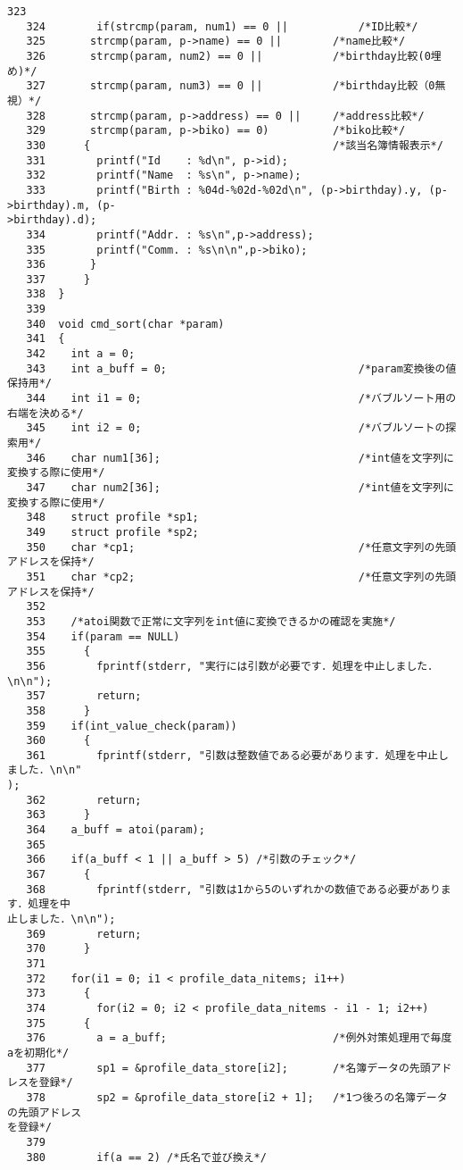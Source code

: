 \begin{Verbatim}[fontsize=\small, baselinestretch=0.8]
   323	
   324	      if(strcmp(param, num1) == 0 ||           /*ID比較*/
   325		 strcmp(param, p->name) == 0 ||        /*name比較*/
   326		 strcmp(param, num2) == 0 ||           /*birthday比較(0埋め)*/
   327		 strcmp(param, num3) == 0 ||           /*birthday比較（0無視）*/
   328		 strcmp(param, p->address) == 0 ||     /*address比較*/
   329		 strcmp(param, p->biko) == 0)          /*biko比較*/
   330		{                                      /*該当名簿情報表示*/
   331		  printf("Id    : %d\n", p->id);
   332		  printf("Name  : %s\n", p->name);
   333		  printf("Birth : %04d-%02d-%02d\n", (p->birthday).y, (p->birthday).m, (p-
>birthday).d);
   334		  printf("Addr. : %s\n",p->address);
   335		  printf("Comm. : %s\n\n",p->biko);
   336		 }
   337	    }
   338	}
   339	
   340	void cmd_sort(char *param)
   341	{
   342	  int a = 0;
   343	  int a_buff = 0;                              /*param変換後の値保持用*/  
   344	  int i1 = 0;                                  /*バブルソート用の右端を決める*/
   345	  int i2 = 0;                                  /*バブルソートの探索用*/
   346	  char num1[36];                               /*int値を文字列に変換する際に使用*/
   347	  char num2[36];                               /*int値を文字列に変換する際に使用*/
   348	  struct profile *sp1;
   349	  struct profile *sp2;
   350	  char *cp1;                                   /*任意文字列の先頭アドレスを保持*/
   351	  char *cp2;                                   /*任意文字列の先頭アドレスを保持*/
   352	
   353	  /*atoi関数で正常に文字列をint値に変換できるかの確認を実施*/
   354	  if(param == NULL)
   355	    {
   356	      fprintf(stderr, "実行には引数が必要です．処理を中止しました．\n\n");
   357	      return;
   358	    }
   359	  if(int_value_check(param))
   360	    {
   361	      fprintf(stderr, "引数は整数値である必要があります．処理を中止しました．\n\n"
);
   362	      return;
   363	    }
   364	  a_buff = atoi(param);
   365	
   366	  if(a_buff < 1 || a_buff > 5) /*引数のチェック*/
   367	    {
   368	      fprintf(stderr, "引数は1から5のいずれかの数値である必要があります．処理を中
止しました．\n\n");
   369	      return;
   370	    }
   371	
   372	  for(i1 = 0; i1 < profile_data_nitems; i1++)
   373	    {
   374	      for(i2 = 0; i2 < profile_data_nitems - i1 - 1; i2++)
   375		{
   376		  a = a_buff;                          /*例外対策処理用で毎度aを初期化*/
   377		  sp1 = &profile_data_store[i2];       /*名簿データの先頭アドレスを登録*/
   378		  sp2 = &profile_data_store[i2 + 1];   /*1つ後ろの名簿データの先頭アドレス
を登録*/
   379	
   380		  if(a == 2) /*氏名で並び換え*/

\end{Verbatim}
